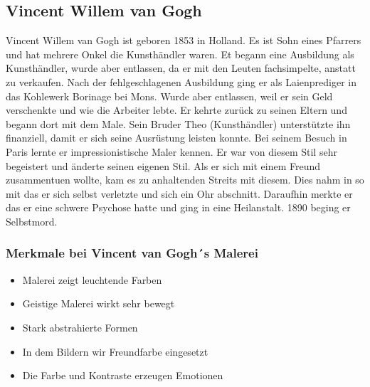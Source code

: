 \subsection{Vincent Willem van Gogh}
Vincent Willem van Gogh ist geboren 1853 in Holland. Es ist Sohn eines Pfarrers und hat mehrere Onkel die Kunsthändler
waren. Et begann eine Ausbildung als Kunsthändler, wurde aber entlassen, da er mit den Leuten fachsimpelte, anstatt zu
verkaufen. Nach der fehlgeschlagenen Ausbildung ging er als Laienprediger in das Kohlewerk Borinage bei Mons. Wurde aber
entlassen, weil er sein Geld verschenkte und wie die Arbeiter lebte. Er kehrte zurück zu seinen Eltern und begann dort mit
dem Male. Sein Bruder Theo (Kunsthändler) unterstützte ihn finanziell, damit er sich seine Ausrüstung leisten konnte. Bei
seinem Besuch in Paris lernte er impressionistische Maler kennen. Er war von diesem Stil sehr begeistert und änderte seinen
eigenen Stil. Als er sich mit einem Freund zusammentuen wollte, kam es zu anhaltenden Streits mit diesem. Dies nahm in so
mit das er sich selbst verletzte und sich ein Ohr abschnitt. Daraufhin merkte er das er eine schwere Psychose hatte und
ging in eine Heilanstalt. 1890 beging er Selbstmord.

\subsubsection{Merkmale bei Vincent van Gogh´s Malerei}
\begin{itemize}
	\item Malerei zeigt leuchtende Farben
	\item Geistige Malerei wirkt sehr bewegt
	\item Stark abstrahierte Formen
	\item In dem Bildern wir Freundfarbe eingesetzt
	\item Die Farbe und Kontraste erzeugen Emotionen
\end{itemize}

